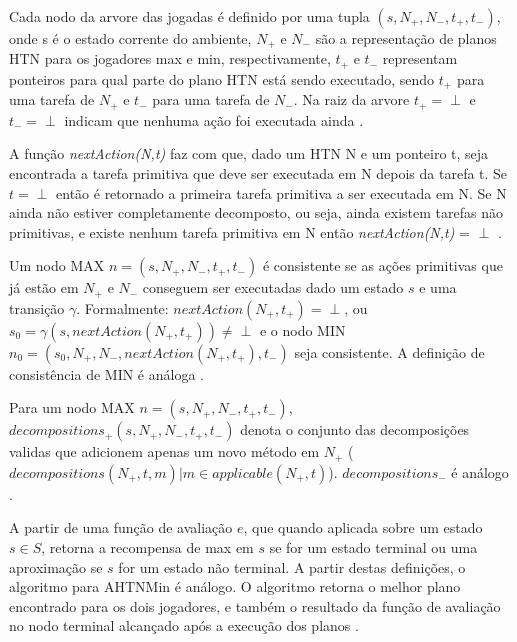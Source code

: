 Cada nodo da arvore das jogadas é definido por uma tupla $(s, N_{+}, N_{-}, t_{+}, t_{-})$, onde s é o estado corrente do ambiente, $N_{+}$ e $N_{-}$ são a representação de planos HTN para os jogadores max e min, respectivamente, $t_{+}$ e $t_{-}$ representam ponteiros para qual parte do plano HTN está sendo executado, sendo  $t_{+}$ para uma tarefa de $N_{+}$ e $t_{-}$ para uma tarefa de $N_{-}$. Na raiz da arvore $t_{+} = \perp$ e $t_{-} = \perp$ indicam que nenhuma ação foi executada ainda \cite{ontanon2015adversarial}.

A função \textit{nextAction(N,t)} faz com que, dado um HTN N e um ponteiro t, seja encontrada a tarefa primitiva que deve ser executada em N depois da tarefa t. Se $t = \perp$ então é retornado a primeira tarefa primitiva a ser executada em N. Se N ainda não estiver completamente decomposto, ou seja, ainda existem tarefas não primitivas, e existe nenhum tarefa primitiva em N então \textit{nextAction(N,t)} = $\perp$ \cite{ontanon2015adversarial}.

Um nodo MAX $n = (s, N_{+}, N_{-}, t_{+}, t_{-})$ é consistente se as ações primitivas que já estão em $N_{+}$ e $N_{-}$ conseguem ser executadas dado um estado $s$ e uma transição $\gamma$. Formalmente: $nextAction(N_{+}, t_{+}) = \perp$, ou $s_{0} = \gamma(s, nextAction(N_{+}, t_{+})) \neq \perp$ e o nodo MIN $n_{0} = (s_{0}, N_{+}, N_{-}, nextAction(N_{+}, t_{+}), t_{-})$ seja consistente. A definição de consistência de MIN é análoga \cite{ontanon2015adversarial}.

Para um nodo MAX $n = (s, N_{+}, N_{-}, t_{+}, t_{-})$, $decompositions_{+}(s, N_{+}, N_{-}, t_{+}, t_{-})$ denota o conjunto das decomposições validas que adicionem apenas um novo método em $N_{+}$ (${decompositions(N_{+}, t, m) | m \in applicable(N_{+}, t)}$).  $decompositions_{-}$ é análogo \cite{ontanon2015adversarial}.

A partir de uma função de avaliação $e$, que quando aplicada sobre um estado $s \in S$, retorna a recompensa de max em $s$ se for um estado terminal ou uma aproximação se $s$ for um estado não terminal. A partir destas definições, o algoritmo para AHTNMin é análogo. O algoritmo retorna o melhor plano encontrado para os dois jogadores, e também o resultado da função de avaliação no nodo terminal alcançado após a execução dos planos \cite{ontanon2015adversarial}. 


